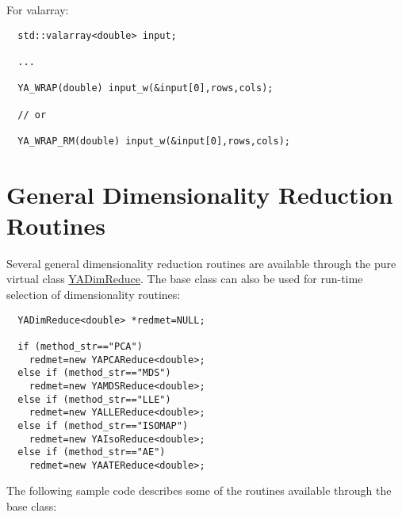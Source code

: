 For valarray:



\footnotesize\begin{verbatim}  std::valarray<double> input;
  
  ...
  
  YA_WRAP(double) input_w(&input[0],rows,cols);
  
  // or
  
  YA_WRAP_RM(double) input_w(&input[0],rows,cols);
\end{verbatim}
\normalsize


\par
 \par
 \hypertarget{index_general}{}\section{General Dimensionality Reduction Routines}\label{index_general}
Several general dimensionality reduction routines are available through the pure virtual class \hyperlink{class_y_a_dim_reduce}{YADim\-Reduce}. The base class can also be used for run-time selection of dimensionality routines:



\footnotesize\begin{verbatim}  YADimReduce<double> *redmet=NULL;
  
  if (method_str=="PCA")
    redmet=new YAPCAReduce<double>;
  else if (method_str=="MDS")
    redmet=new YAMDSReduce<double>;
  else if (method_str=="LLE")
    redmet=new YALLEReduce<double>;
  else if (method_str=="ISOMAP")
    redmet=new YAIsoReduce<double>;
  else if (method_str=="AE")
    redmet=new YAATEReduce<double>;
\end{verbatim}
\normalsize


The following sample code describes some of the routines available through the base class:



